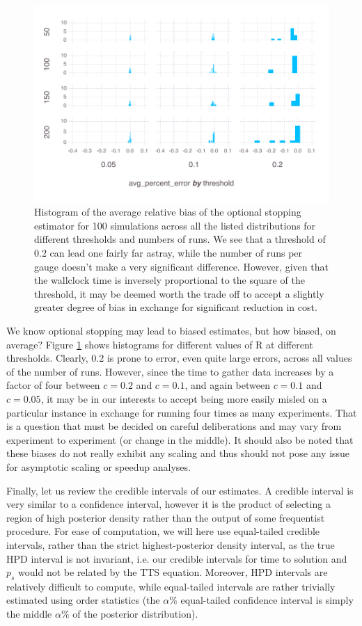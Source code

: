 \begin{figure}[hbt]
  \includegraphics{chapters/Benchmarking/errors}
  \caption{Histogram of the average relative bias of the optional stopping estimator for 100 simulations across all the listed distributions for different thresholds and numbers of runs. We see that a threshold of 0.2 can lead one fairly far astray, while the number of runs per gauge doesn't make a very significant difference. However, given that the wallclock time is inversely proportional to the square of the threshold, it may be deemed worth the trade off to accept a slightly greater degree of bias in exchange for significant reduction in cost.}
  \label{fig:histbias}
\end{figure}


We know optional stopping may lead to biased estimates, but how biased, on average? Figure \ref{fig:histbias} shows histograms for different values of R at different thresholds. Clearly, 0.2 is prone to error, even quite large errors, across all values of the number of runs. However, since the time to gather data increases by a factor of four between $c=0.2$ and $c=0.1$, and again between $c=0.1$ and $c=0.05$, it may be in our interests to accept being more easily misled on a particular instance in exchange for running four times as many experiments. That is a question that must be decided on careful deliberations and may vary from experiment to experiment (or change in the middle). It should also be noted that these biases do not really exhibit any scaling and thus should not pose any issue for asymptotic scaling or speedup analyses.

Finally, let us review the credible intervals of our estimates. A credible interval is very similar to a confidence interval, however it is the product of selecting a region of high posterior density rather than the output of some frequentist procedure. For ease of computation, we will here use equal-tailed credible intervals, rather than the strict highest-posterior density interval, as the true HPD interval is not invariant, i.e. our credible intervals for time to solution and $p_s$ would not be related by the TTS equation. Moreover, HPD intervals are relatively difficult to compute, while equal-tailed intervals are rather trivially estimated using order statistics (the $\alpha\%$ equal-tailed confidence interval is simply the middle $\alpha\%$ of the posterior distribution).

